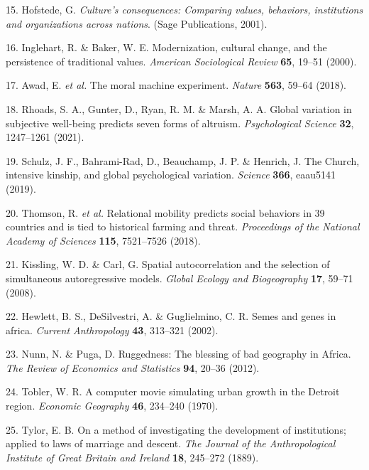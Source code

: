 \documentclass[english,man,floatsintext]{apa6}
\begin{document}
\leavevmode\hypertarget{ref-Hofstede2001}{}%
15. Hofstede, G. \emph{Culture's consequences: Comparing values, behaviors, institutions and organizations across nations}. (Sage Publications, 2001).

\leavevmode\hypertarget{ref-Inglehart2000}{}%
16. Inglehart, R. \& Baker, W. E. Modernization, cultural change, and the persistence of traditional values. \emph{American Sociological Review} \textbf{65}, 19--51 (2000).

\leavevmode\hypertarget{ref-Awad2018}{}%
17. Awad, E. \emph{et al.} The moral machine experiment. \emph{Nature} \textbf{563}, 59--64 (2018).

\leavevmode\hypertarget{ref-Rhoads2021}{}%
18. Rhoads, S. A., Gunter, D., Ryan, R. M. \& Marsh, A. A. Global variation in subjective well-being predicts seven forms of altruism. \emph{Psychological Science} \textbf{32}, 1247--1261 (2021).

\leavevmode\hypertarget{ref-Schulz2019}{}%
19. Schulz, J. F., Bahrami-Rad, D., Beauchamp, J. P. \& Henrich, J. The Church, intensive kinship, and global psychological variation. \emph{Science} \textbf{366}, eaau5141 (2019).

\leavevmode\hypertarget{ref-Thomson2018}{}%
20. Thomson, R. \emph{et al.} Relational mobility predicts social behaviors in 39 countries and is tied to historical farming and threat. \emph{Proceedings of the National Academy of Sciences} \textbf{115}, 7521--7526 (2018).

\leavevmode\hypertarget{ref-Kissling2008}{}%
21. Kissling, W. D. \& Carl, G. Spatial autocorrelation and the selection of simultaneous autoregressive models. \emph{Global Ecology and Biogeography} \textbf{17}, 59--71 (2008).

\leavevmode\hypertarget{ref-Hewlett2002}{}%
22. Hewlett, B. S., DeSilvestri, A. \& Guglielmino, C. R. Semes and genes in africa. \emph{Current Anthropology} \textbf{43}, 313--321 (2002).

\leavevmode\hypertarget{ref-Nunn2012}{}%
23. Nunn, N. \& Puga, D. Ruggedness: The blessing of bad geography in Africa. \emph{The Review of Economics and Statistics} \textbf{94}, 20--36 (2012).

\leavevmode\hypertarget{ref-Tobler1970}{}%
24. Tobler, W. R. A computer movie simulating urban growth in the Detroit region. \emph{Economic Geography} \textbf{46}, 234--240 (1970).

\leavevmode\hypertarget{ref-Tylor1889}{}%
25. Tylor, E. B. On a method of investigating the development of institutions; applied to laws of marriage and descent. \emph{The Journal of the Anthropological Institute of Great Britain and Ireland} \textbf{18}, 245--272 (1889).
\end{document}
